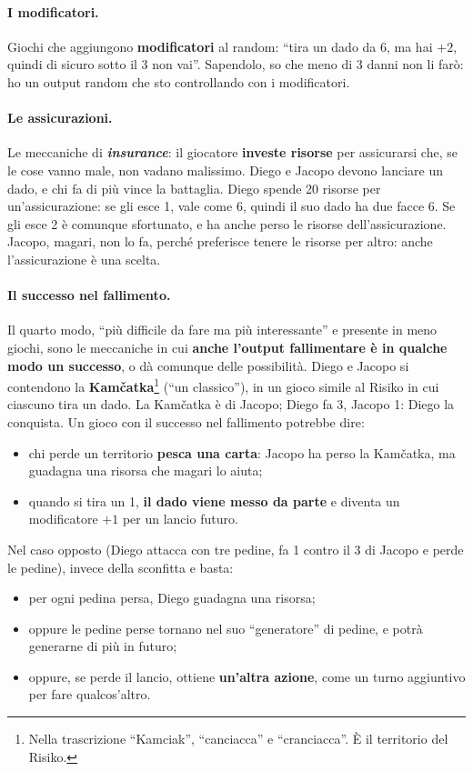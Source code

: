 \paragraph{I modificatori.} Giochi che aggiungono \textbf{modificatori} al random: ``tira un
dado da 6, ma hai $+2$, quindi di sicuro sotto il 3 non vai''. Sapendolo, so che meno di 3
danni non li farò: ho un output random che sto controllando con i modificatori.

\paragraph{Le assicurazioni.} Le meccaniche di \textbf{\emph{insurance}}: il giocatore
\textbf{investe risorse} per assicurarsi che, se le cose vanno male, non vadano malissimo.
Diego e Jacopo devono lanciare un dado, e chi fa di più vince la battaglia. Diego spende 20
risorse per un'assicurazione: se gli esce 1, vale come 6, quindi il suo dado ha due facce 6.
Se gli esce 2 è comunque sfortunato, e ha anche perso le risorse dell'assicurazione. Jacopo,
magari, non lo fa, perché preferisce tenere le risorse per altro: anche l'assicurazione è una
scelta.

\paragraph{Il successo nel fallimento.} Il quarto modo, ``più difficile da fare ma più
interessante'' e presente in meno giochi, sono le meccaniche in cui \textbf{anche l'output
fallimentare è in qualche modo un successo}, o dà comunque delle possibilità. Diego e Jacopo
si contendono la \textbf{Kamčatka}\footnote{Nella trascrizione ``Kamciak'', ``canciacca'' e
``cranciacca''. È il territorio del Risiko.} (``un classico''), in un gioco simile al Risiko
in cui ciascuno tira un dado. La Kamčatka è di Jacopo; Diego fa 3, Jacopo 1: Diego la
conquista. Un gioco con il successo nel fallimento potrebbe dire:
\begin{itemize}
  \item chi perde un territorio \textbf{pesca una carta}: Jacopo ha perso la Kamčatka, ma
        guadagna una risorsa che magari lo aiuta;
  \item quando si tira un 1, \textbf{il dado viene messo da parte} e diventa un modificatore
        $+1$ per un lancio futuro.
\end{itemize}
Nel caso opposto (Diego attacca con tre pedine, fa 1 contro il 3 di Jacopo e perde le
pedine), invece della sconfitta e basta:
\begin{itemize}
  \item per ogni pedina persa, Diego guadagna una risorsa;
  \item oppure le pedine perse tornano nel suo ``generatore'' di pedine, e potrà generarne di
        più in futuro;
  \item oppure, se perde il lancio, ottiene \textbf{un'altra azione}, come un turno
        aggiuntivo per fare qualcos'altro.
\end{itemize}

